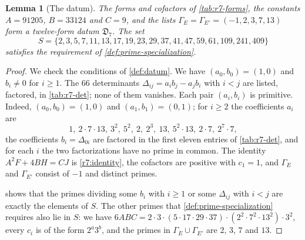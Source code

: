 \documentclass[12pt,oneside,openany]{book}
\theoremstyle{definition}
\theoremstyle{plain}
\numberwithin{equation}{chapter}
\theoremstyle{plain}
\newtheorem{lemma}[lemma]{Lemma}
\theoremstyle{definition}
\theoremstyle{remark}
\newcommand{\datum}{\mathfrak D}
\begin{document}
\begin{lemma}[The datum]\label{lem:r7-datum}
The forms and cofactors of \cref{tab:r7-forms}, the constants $A=91205$,
$B=33124$ and $C=9$, and the lists $\Gamma_E=\Gamma_{E'}=(-1,2,3,7,13)$ form
a twelve-form datum $\datum_7$. The set
\begin{equation}\label{r7:S}
 S=\{2,3,5,7,11,13,17,19,23,29,37,41,47,59,61,109,241,409\}
\end{equation}
satisfies the requirement of \cref{def:prime-specialization}.
\end{lemma}

\begin{proof}
We check the conditions of \cref{def:datum}. We have $(a_0,b_0)=(1,0)$ and
$b_i\ne0$ for $i\ge1$. The $66$ determinants
$\Delta_{ij}=a_ib_j-a_jb_i$ with $i<j$ are listed, factored, in
\cref{tab:r7-det}; none of them vanishes. Each pair $(a_i,b_i)$ is
primitive. Indeed, $(a_0,b_0)=(1,0)$ and $(a_1,b_1)=(0,1)$; for $i\ge2$ the
coefficients $a_i$ are
\[
 1,\ 2\cdot7\cdot13,\ 3^2,\ 5^2,\ 2,\ 2^3,\ 13,\ 5^2\cdot13,\ 2\cdot7,\
 2^7\cdot7,
\]
the coefficients $b_i=\Delta_{0i}$ are factored in the first eleven entries
of \cref{tab:r7-det}, and for each $i$ the two factorizations have no prime
in common. The identity $A^2F+4BH=CJ$ is \eqref{r7:identity}, the
cofactors are positive with $c_1=1$, and $\Gamma_E$ and $\Gamma_{E'}$
consist of $-1$ and distinct primes.

 shows that the primes dividing some $b_i$ with $i\ge1$ or some
$\Delta_{ij}$ with $i<j$ are exactly the elements of $S$. The other primes
that \cref{def:prime-specialization} requires also lie in $S$: we have
$6ABC=2\cdot3\cdot(5\cdot17\cdot29\cdot37)\cdot(2^2\cdot7^2\cdot13^2)\cdot3^2$,
every $c_i$ is of the form $2^a3^b$, and the primes in
$\Gamma_E\cup\Gamma_{E'}$ are $2$, $3$, $7$ and $13$.
\end{proof}
\end{document}
